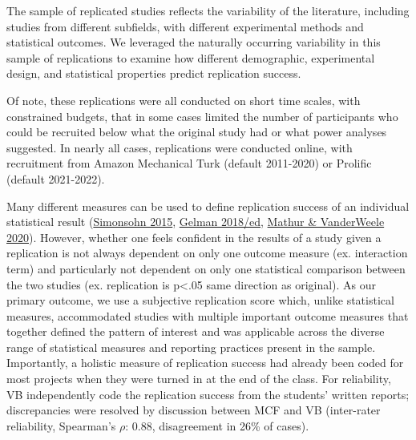 \documentclass[
  english,
  a4paper,
]{article}
\begin{document}
The sample of replicated studies reflects the variability of the literature, including studies from different subfields, with different experimental methods and statistical outcomes. We leveraged the naturally occurring variability in this sample of replications to examine how different demographic, experimental design, and statistical properties predict replication success.

Of note, these replications were all conducted on short time scales, with constrained budgets, that in some cases limited the number of participants who could be recruited below what the original study had or what power analyses suggested. In nearly all cases, replications were conducted online, with recruitment from Amazon Mechanical Turk (default 2011-2020) or Prolific (default 2021-2022).

Many different measures can be used to define replication success of an individual statistical result (\protect\hyperlink{ref-simonsohn2015}{Simonsohn 2015}, \protect\hyperlink{ref-gelman2018}{Gelman 2018/ed}, \protect\hyperlink{ref-mathur2020}{Mathur \& VanderWeele 2020}). However, whether one feels confident in the results of a study given a replication is not always dependent on only one outcome measure (ex. interaction term) and particularly not dependent on only one statistical comparison between the two studies (ex. replication is p\textless.05 same direction as original). As our primary outcome, we use a subjective replication score which, unlike statistical measures, accommodated studies with multiple important outcome measures that together defined the pattern of interest and was applicable across the diverse range of statistical measures and reporting practices present in the sample. Importantly, a holistic measure of replication success had already been coded for most projects when they were turned in at the end of the class. For reliability, VB independently code the replication success from the students' written reports; discrepancies were resolved by discussion between MCF and VB (inter-rater reliability, Spearman's \(\rho\): 0.88, disagreement in 26\% of cases).
\end{document}
